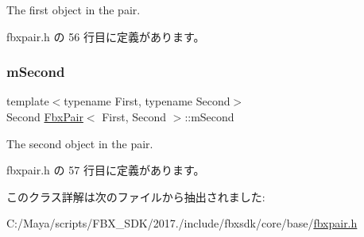 The first object in the pair. 



 fbxpair.\+h の 56 行目に定義があります。

\mbox{\label{class_fbx_pair_ade45092061639a0a4256a0df59365d47}} 
\subsubsection{\texorpdfstring{m\+Second}{mSecond}}
{\footnotesize\ttfamily template$<$typename First, typename Second$>$ \\
Second \hyperlink{class_fbx_pair}{Fbx\+Pair}$<$ First, Second $>$\+::m\+Second}



The second object in the pair. 



 fbxpair.\+h の 57 行目に定義があります。



このクラス詳解は次のファイルから抽出されました\+:\begin{DoxyCompactItemize}
\item 
C\+:/\+Maya/scripts/\+F\+B\+X\+\_\+\+S\+D\+K/2017./include/fbxsdk/core/base/\hyperlink{fbxpair_8h}{fbxpair.\+h}\end{DoxyCompactItemize}
